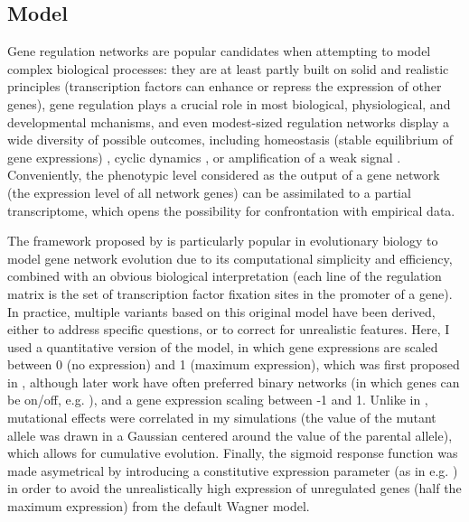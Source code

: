 \documentclass[10pt,a4paper]{article}
\begin{document}
\subsection{Model}

Gene regulation networks are popular candidates when attempting to model complex biological processes: they are at least partly built on solid and realistic principles (transcription factors can enhance or repress the expression of other genes), gene regulation plays a crucial role in most biological, physiological, and developmental mchanisms, and even modest-sized regulation networks display a wide diversity of possible outcomes, including homeostasis (stable equilibrium of gene expressions) \citep{Ste99}, cyclic dynamics \citep{LG03,ARB+10}, or amplification of a weak signal \citep{HB08}. Conveniently, the phenotypic level considered as the output of a gene network (the expression level of all network genes) can be assimilated to a partial transcriptome, which opens the possibility for confrontation with empirical data. 

The framework proposed by \citep{Wag94,Wag96} is particularly popular in evolutionary biology to model gene network evolution due to its computational simplicity and efficiency, combined with an obvious biological interpretation (each line of the regulation matrix is the set of transcription factor fixation sites in the promoter of a gene). In practice, multiple variants based on this original model have been derived, either to address specific questions, or to correct for unrealistic features. Here, I used a quantitative version of the model, in which gene expressions are scaled between 0 (no expression) and 1 (maximum expression), which was first proposed in \citep{Wag94}, although later work have often preferred  binary networks (in which genes can be on/off, e.g. \citep{Wag96,CMW07}), and a gene expression scaling between -1 and 1. Unlike in \citealp{Wag96, SB02}, mutational effects were correlated in my simulations (the value of the mutant allele was drawn in a Gaussian centered around the value of the parental allele), which allows for cumulative evolution. Finally, the sigmoid response function was made asymetrical by introducing a constitutive expression parameter (as in e.g. \citealp{RL16}) in order to avoid the unrealistically high expression of unregulated genes (half the maximum expression) from the default Wagner model. 
\end{document}

